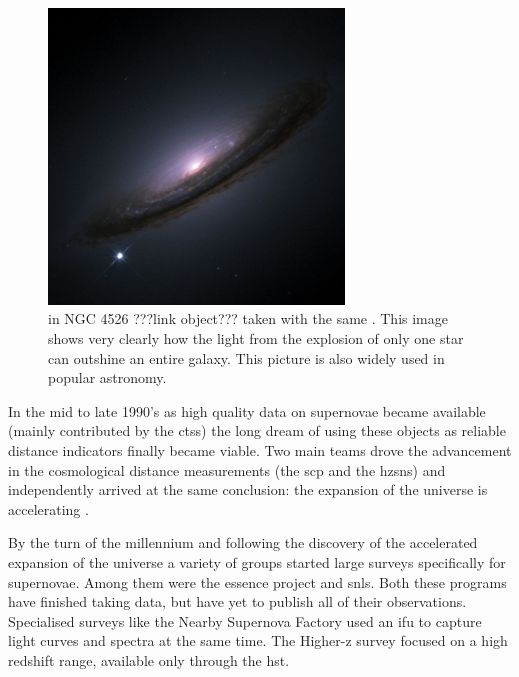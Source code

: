 \begin{figure}[htbp] %
   \centering
   \includegraphics[width=0.7\textwidth]{chapter_intro/plots/sn1994d.jpg} 
   \caption{ in NGC 4526 ???link object??? taken with the same . This image shows very clearly how the light from the explosion of only one star can outshine an entire galaxy. This picture is also widely used in popular astronomy.}
   \label{fig:sn1994d}
\end{figure}

In the mid to late 1990's as high quality data on supernovae became available (mainly contributed by the \gls{ctss}) the long dream \citep[e.g.][]{1938ApJ....88..285B, 1960ZA.....49..201V, 1968AJ.....73.1021K} of using these objects as reliable distance indicators finally became viable. Two main teams drove the advancement in the cosmological distance measurements (the \gls{scp} and the \gls{hzsns}) and independently arrived at the same conclusion: the expansion of the universe is accelerating \citep{1998AJ....116.1009R,1999ApJ...517..565P}.

By the turn of the millennium and following the discovery of the accelerated expansion of the universe a variety of groups started large surveys specifically for supernovae. Among them were the \gls{essence} project and \gls{snls}. Both these programs have finished taking data, but have yet to publish all of their observations. Specialised surveys like the Nearby Supernova Factory \citep{2002SPIE.4836...61A} used an \gls{ifu} to capture light curves and spectra at the same time. The Higher-z survey \citep{2004ApJ...613..200S} focused on a high redshift range, available only through the \gls{hst}.

